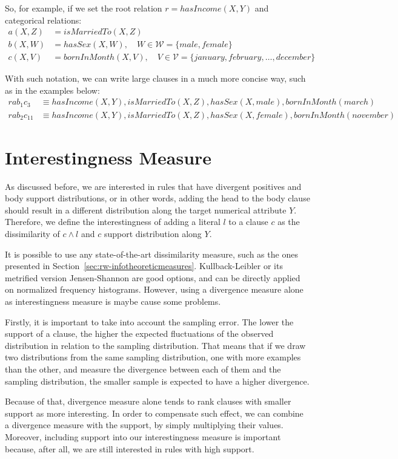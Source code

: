 So, for example, if we set the root relation $r=hasIncome(X,Y)$ and categorical relations:
\begin{align*}
a(X,Z)&=isMarriedTo(X,Z) \\
b(X,W)&=hasSex(X,W), \quad W \in \mathcal{W} =\{male,female\} \\
c(X,V)&=bornInMonth(X,V), \quad V \in \mathcal{V} =\{january,february,\ldots,december\}
\end{align*}

With such notation, we can write large clauses in a much more concise way, such as in the examples below:
\begin{align*}
rab_1c_3 &\equiv hasIncome(X,Y),isMarriedTo(X,Z),hasSex(X,male),bornInMonth(march) \\
rab_2c_{11} &\equiv hasIncome(X,Y),isMarriedTo(X,Z),hasSex(X,female),bornInMonth(november)
\end{align*}

\section{Interestingness Measure}

As discussed before, we are interested in rules that have divergent positives and body support distributions, or in
other words, adding the head to the body clause should result in a different distribution along the target numerical
attribute $Y$. Therefore, we define the interestingness of adding a literal $l$ to a clause $c$ as the
dissimilarity of $c \wedge l$ and $c$ support distribution along $Y$.

It is possible to use any state-of-the-art dissimilarity measure, such as the ones presented
in Section~\ref{sec:rw-infotheoreticmeasures}. Kullback-Leibler or its metrified version Jensen-Shannon are good
options, and can be directly applied on normalized frequency histograms. However, using a divergence
measure alone as interestingness measure is maybe cause some problems.

Firstly, it is important to take into account the sampling error. The lower the support of a clause, the higher the
expected fluctuations of the observed distribution in relation to the sampling distribution. That means that if we
draw two distributions from the same sampling distribution, one with more examples than the other, and measure the
divergence between each of them and the sampling distribution, the smaller sample is expected to have a higher
divergence.

Because of that, divergence measure alone tends to rank clauses with smaller support as more interesting. In order to
compensate such effect, we can combine a divergence measure with the support, by simply multiplying their values.
Moreover, including support into our interestingness measure is important because, after all, we are still interested
in rules with high support.

